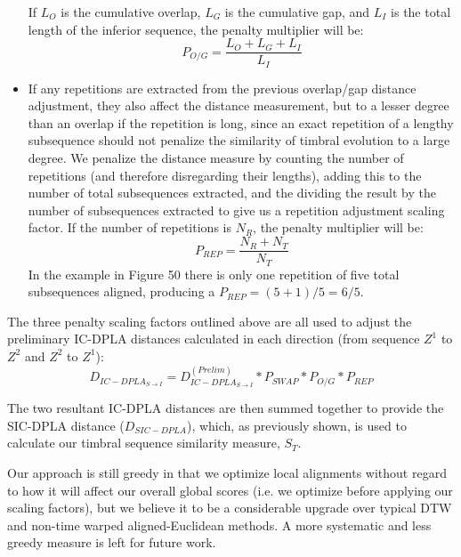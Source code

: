 \documentclass[12pt]{report} 	%
\numberwithin{figure}{chapter}
\numberwithin{table}{chapter}
\numberwithin{equation}{chapter}
\begin{document}
\begin{flushleft}
\begin{itemize}
\begin{figure}[h!]
\begin{center}
\end{center}
\vspace{12pt}
\end{figure}
If $L_O$ is the cumulative overlap, $L_G$ is the cumulative gap, and $L_I$ is the total length of the inferior sequence, the penalty multiplier will be:
\begin{equation}
P_{O/G} = \frac{L_O+L_G+L_I}{L_I}
\end{equation}
\item If any repetitions are extracted from the previous overlap/gap distance adjustment, they also affect the distance measurement, but to a lesser degree than an overlap if the repetition is long, since an exact repetition of a lengthy subsequence should not penalize the similarity of timbral evolution to a large degree. We penalize the distance measure by counting the number of repetitions (and therefore disregarding their lengths), adding this to the number of total subsequences extracted, and the dividing the result by the number of subsequences extracted to give us a repetition adjustment scaling factor. If the number of repetitions is $N_R$, the penalty multiplier will be:
\begin{equation}
P_{REP} = \frac{N_R+N_T}{N_T}
\end{equation}
In the example in Figure 50 there is only one repetition of five total subsequences aligned, producing a $P_{REP}=(5+1)/5=6/5$.
\end{itemize}

The three penalty scaling factors outlined above are all used to adjust the preliminary IC-DPLA distances calculated in each direction (from sequence $Z^1$ to $Z^2$ and $Z^2$ to $Z^1$):
\begin{equation}
D_{IC-DPLA_{S \to I}} = D_{IC-DPLA_{S \to I}}^{(Prelim)} * P_{SWAP} * P_{O/G} * P_{REP}
\end{equation}

The two resultant IC-DPLA distances are then summed together to provide the SIC-DPLA distance ($D_{SIC-DPLA}$), which, as previously shown, is used to calculate our timbral sequence similarity measure, $S_T$.

Our approach is still greedy in that we optimize local alignments without regard to how it will affect our overall global scores (i.e. we optimize before applying our scaling factors), but we believe it to be a considerable upgrade over typical DTW and non-time warped aligned-Euclidean methods. A more systematic and less greedy measure is left for future work.


\end{flushleft}
\end{document}
